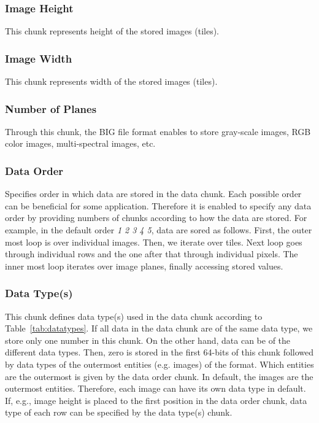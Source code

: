 \documentclass{article}
\begin{document}
\subsubsection{Image Height}
This chunk represents height of the stored images (tiles).

\subsubsection{Image Width}
This chunk represents width of the stored images (tiles).

\subsubsection{Number of Planes}
Through this chunk, the BIG file format enables to store gray-scale images, RGB color images, multi-spectral images, etc.

\subsubsection{Data Order}
Specifies order in which data are stored in the data chunk. Each possible order can be beneficial for some application. Therefore it is enabled to specify any data order by providing numbers of chunks according to how the data are stored. For example, in the default order \textit{1 2 3 4 5}, data are sored as follows. First, the outer most loop is over individual images. Then, we iterate over tiles. Next loop goes through individual rows and the one after that through individual pixels. The inner most loop iterates over image planes, finally accessing stored values.

\subsubsection{Data Type(s)}
This chunk defines data type(s) used in the data chunk according to Table~\ref{tab:datatypes}. If all data in the data chunk are of the same data type, we store only one number in this chunk. On the other hand, data can be of the different data types. Then, zero is stored in the first 64-bits of this chunk followed by data types of the outermost entities (e.g. images) of the format. Which entities are the outermost is given by the data order chunk. In default, the images are the outermost entities. Therefore, each image can have its own data type in default. If, e.g., image height is placed to the first position in the data order chunk, data type of each row can be specified by the data type(s) chunk.
\end{document}
